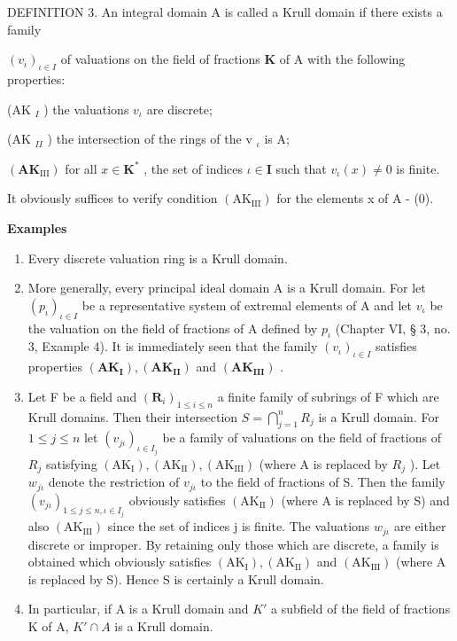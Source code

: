 DEFINITION 3. An integral domain A is called a Krull domain if there exists a family

\((v_{\iota})_{\iota\in I}\) of valuations on the field of fractions \(\mathbf{K}\) of A with the following properties:

(AK \(_{I}\) ) the valuations \(v_{\iota}\) are discrete;

(AK \(_{II}\) ) the intersection of the rings of the v \(_{\iota}\) is A;

\((\mathbf{A}\mathbf{K}_{\mathrm{III}})\) for all \(x \in \mathbf{K}^*\) , the set of indices \(\iota \in \mathbf{I}\) such that \(v_{\iota}(x) \neq 0\) is finite.

It obviously suffices to verify condition \((\mathrm{AK}_{\mathrm{III}})\) for the elements x of A - (0).

\textbf{Examples}\par

\begin{enumerate}
\def\labelenumi{(\arabic{enumi})}
\item
  Every discrete valuation ring is a Krull domain.
\item
  More generally, every principal ideal domain A is a Krull domain. For let \((p_{\iota})_{\iota\in I}\) be a representative system of extremal elements of A and let \(v_{\iota}\) be the valuation on the field of fractions of A defined by \(p_{\iota}\) (Chapter VI, § 3, no. 3, Example 4). It is immediately seen that the family \((v_{\iota})_{\iota\in I}\) satisfies properties \((\mathbf{AK}_{\mathbf{I}}), (\mathbf{AK}_{\mathbf{II}})\) and \((\mathbf{AK}_{\mathbf{III}})\) .
\item
  Let F be a field and \((\mathbf{R}_{i})_{1\leqslant i\leqslant n}\) a finite family of subrings of F which are Krull domains. Then their intersection \(S=\bigcap_{j=1}^{n}R_{j}\) is a Krull domain. For \(1\leqslant j\leqslant n\) let \((v_{j\iota})_{\iota\in I_j}\) be a family of valuations on the field of fractions of \(R_{j}\) satisfying \((\mathrm{AK}_{\mathrm{I}}),(\mathrm{AK}_{\mathrm{II}}),(\mathrm{AK}_{\mathrm{III}})\) (where A is replaced by \(R_{j}\) ). Let \(w_{j\iota}\) denote the restriction of \(v_{j\iota}\) to the field of fractions of S. Then the family \((v_{j\iota})_{1\leqslant j\leqslant n,\iota\in I_j}\) obviously satisfies \((\mathrm{AK}_{\mathrm{II}})\) (where A is replaced by S) and also \((\mathrm{AK}_{\mathrm{III}})\) since the set of indices j is finite. The valuations \(w_{j\iota}\) are either discrete or improper. By retaining only those which are discrete, a family is obtained which obviously satisfies \((\mathrm{AK}_{\mathrm{I}}),(\mathrm{AK}_{\mathrm{II}})\) and \((\mathrm{AK}_{\mathrm{III}})\) (where A is replaced by S). Hence S is certainly a Krull domain.
\item
  In particular, if A is a Krull domain and \(K'\) a subfield of the field of fractions K of A, \(K' \cap A\) is a Krull domain.
\end{enumerate}


